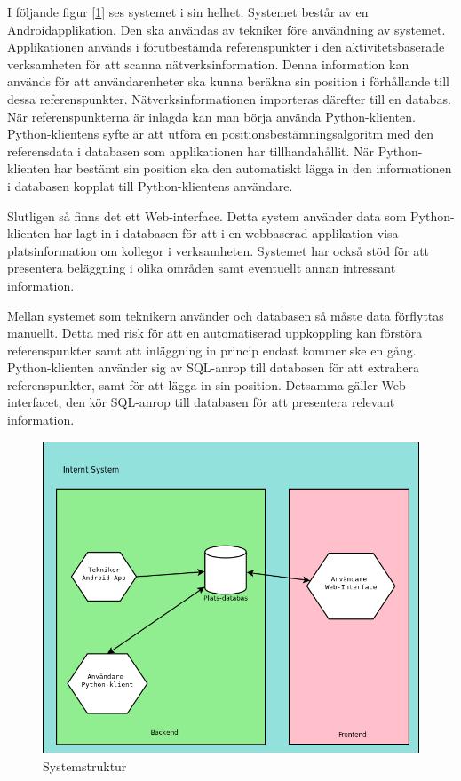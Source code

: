 \documentclass[swedish, a4paper,12pt]{article}
\begin{document}
I följande figur [\ref{fig:systemStruktur}] ses systemet i sin helhet. Systemet består av en Androidapplikation. Den ska användas av tekniker före användning av systemet. Applikationen används i förutbestämda referenspunkter i den aktivitetsbaserade verksamheten för att scanna nätverksinformation. Denna information kan används för att användarenheter ska kunna beräkna sin position i förhållande till  dessa referenspunkter.  Nätverksinformationen importeras därefter till en databas. När referenspunkterna är inlagda kan man börja använda Python-klienten. Python-klientens syfte är att utföra en positionsbestämningsalgoritm med den referensdata i databasen som applikationen har tillhandahållit. När Python-klienten har bestämt sin position ska den automatiskt lägga in den informationen i databasen kopplat till Python-klientens användare.

Slutligen så finns det ett Web-interface. Detta system använder data som Python-klienten har lagt in i databasen för att i en webbaserad applikation visa platsinformation om kollegor i verksamheten. Systemet har också stöd för att presentera beläggning i olika områden samt eventuellt annan intressant information.

Mellan systemet som teknikern använder och databasen så måste data förflyttas manuellt. Detta med risk för att en automatiserad uppkoppling kan förstöra referenspunkter samt att inläggning in princip endast kommer ske en gång. Python-klienten använder sig av SQL-anrop till databasen för att extrahera referenspunkter, samt för att lägga in sin position. Detsamma gäller Web-interfacet, den kör SQL-anrop till databasen för att presentera relevant information. %

\begin{figure}[H]
	\includegraphics[width=15cm]{media/systemStruktur.png}
	\caption{Systemstruktur}
	\label{fig:systemStruktur}
\end{figure}
\end{document}
